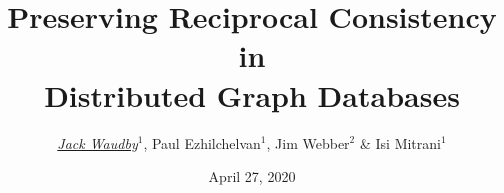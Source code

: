 \title[]{Preserving Reciprocal Consistency in \\ Distributed Graph Databases}

\author[Waudby \& Ezhilchelvan \& Webber \& Mitrani]{\underline{\emph{Jack Waudby}}$^{1}$, Paul Ezhilchelvan$^{1}$, Jim Webber$^{2}$ \& Isi Mitrani$^{1}$}
\date{April 27, 2020}
